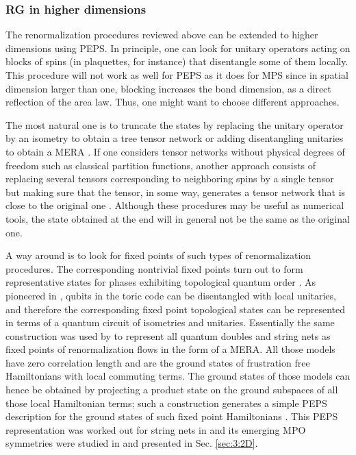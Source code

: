 \documentclass[rmp,aps,reprint,superscriptaddress,nobalancelastpage]{revtex4-1}
\begin{document}
\subsubsection{RG in higher dimensions}

The renormalization procedures reviewed above can be extended to higher dimensions using PEPS. In principle, one can look for unitary operators acting on blocks of spins (in plaquettes, for instance) that disentangle some of them locally. This procedure will not work as well for PEPS as it does for MPS since in spatial dimension larger than one, blocking increases the bond dimension, as a direct reflection of the area law. Thus, one might want to choose different approaches.

The most natural one is to truncate the states by replacing the unitary operator by an isometry to obtain a tree tensor network or adding disentangling unitaries to obtain a MERA \cite{evenbly:2d-mera}. If one considers tensor networks without physical degrees of freedom such as classical partition functions, another approach consists of replacing several tensors corresponding to neighboring spins by a single tensor but making sure that the tensor, in some way, generates a tensor network that is close to the original one \cite{evenbly:tensor-renormalization, gu:TERG, yang:loop-renormalization,bal2017renormalization}. Although these procedures may be useful as numerical tools, the state obtained at the end will in general not be the same as the original one.

A way around is to look for fixed points of such types of renormalization procedures. The corresponding nontrivial fixed points turn out to form representative states for phases exhibiting topological quantum order \cite{wen2017colloquium}. As pioneered in \citet{dennis2002topological},  qubits in the toric code \cite{kitaev:toriccode} can be disentangled with local unitaries, and therefore the corresponding fixed point topological states can be represented in terms of a quantum circuit of isometries and unitaries. Essentially the same construction was used by  \citet{aguado:MERA-toric, konig:MERA-string-nets} to represent all quantum doubles \cite{kitaev:toriccode} and string nets  \cite{levin:stringnets}  as fixed points of renormalization flows in the form of a MERA. All those models have zero correlation length and are the ground states of frustration free Hamiltonians with local commuting terms. The ground states of those models can hence be obtained by projecting a product state on the ground subspaces of all those local Hamiltonian terms; such a construction generates a simple PEPS description for the ground states of such fixed point Hamiltonians \cite{verstraete:comp-power-of-peps}. This PEPS representation was worked out for string nets in \cite{gu2009tensor} and its emerging MPO symmetries were studied in \cite{schuch:peps-sym,sahinoglu:mpo-injectivity} and presented in Sec. \ref{sec:3:2D}.
\end{document}
